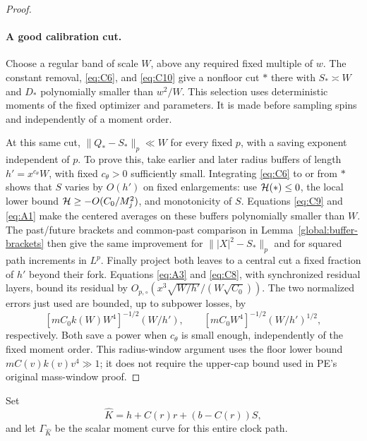 \begin{proof}
\paragraph{A good calibration cut.}

Choose a regular band of scale \(W\), above any required fixed multiple
of \(w\). The constant removal, \eqref{eq:C6}, and \eqref{eq:C10}
give a nonfloor cut \(*\) there with \(S_*\asymp W\) and
\(D_*\) polynomially smaller than \(w^2/W\). This selection uses
deterministic moments of the fixed optimizer and parameters. It is made
before sampling spins and independently of a moment order.

At this same cut, \(\|Q_*-S_*\|_p\ll W\) for every fixed \(p\),
with a saving exponent independent of \(p\). To prove this, take earlier
and later radius buffers of length \(h'=x^{c_\theta}W\), with fixed
\(c_\theta>0\) sufficiently small. Integrating \eqref{eq:C6} to or
from \(*\) shows that \(S\) varies by \(O(h')\) on fixed
enlargements: use \({\cal H}(*)\le0\), the local lower bound
\({\cal H}\ge-O(C_0/M_j^2)\), and monotonicity of \(S\).
Equations \eqref{eq:C9} and \eqref{eq:A1} make the centered averages
on these buffers polynomially smaller than \(W\). The past/future brackets and common-past comparison in
Lemma~\ref{global:buffer-brackets} then give the same improvement for
\(\||X|^2-S_*\|_p\) and for squared path increments in \(L^p\).
Finally project both leaves to a central cut a fixed fraction of
\(h'\) beyond their fork. Equations \eqref{eq:A3} and \eqref{eq:C8},
with synchronized residual layers, bound its residual by
\(O_{p,\circ}(x^3\sqrt{W/h'}/(W\sqrt{C_0}))\).
The two normalized errors just used are bounded, up to subpower losses,
by
\[
 [mC_0k(W)W^4]^{-1/2}(W/h'),\qquad
 [mC_0W^4]^{-1/2}(W/h')^{1/2},
\]
respectively. Both save a power when \(c_\theta\) is small enough,
independently of the fixed moment order. This radius-window argument
uses the floor lower bound \(mC(v)k(v)v^4\gg1\); it does not
require the upper-cap bound used in PE's original mass-window proof.



\end{proof}

Set
\[
 \widehat K=h+C(r)r+(b-C(r))S,
\]
and let \(\Gamma_{\widehat K}\) be the scalar moment curve for this
entire clock path.

